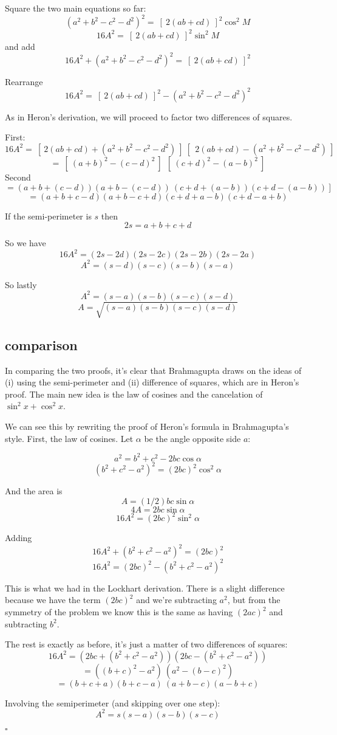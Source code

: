 \documentclass[11pt, oneside]{article}
\begin{document}
Square the two main equations so far:
\[ (a^2 + b^2 - c^2 - d^2)^2 =  \ [ \ 2(ab + cd) \ ]^2 \cos^2 M \]
\[ 16A^2 =  \ [ \ 2(ab + cd) \ ]^2 \sin^2 M \]
and add
\[ 16A^2 + (a^2 + b^2 - c^2 - d^2)^2 =   \ [ \ 2(ab + cd) \ ]^2 \]

Rearrange
\[ 16A^2 =   \ [ \ 2(ab + cd) \ ]^2 - (a^2 + b^2 - c^2 - d^2)^2 \]

As in Heron's derivation, we will proceed to factor two differences of squares.  

First:
\[ 16A^2 =   \ [ \ 2(ab + cd) + (a^2 + b^2 - c^2 - d^2) \ ] \ [ \ \ 2(ab + cd) - (a^2 + b^2 - c^2 - d^2) \ ] \]
\[ = \ [ \ (a + b)^2 - (c - d)^2 \ ] \  \ [ \ (c + d)^2 - (a - b)^2 \ ] \]
Second
\[ = (a + b + (c - d))(a + b - (c - d)) \ (c + d + (a - b))(c + d - (a - b)) \ ] \]
\[ = (a + b + c - d)(a + b - c + d)(c + d + a - b)(c + d - a + b) \]

If the semi-perimeter is $s$ then
\[ 2s = a + b + c + d \]

So we have
\[ 16A^2 = (2s - 2d)(2s - 2c)(2s - 2b)(2s - 2a) \]
\[ A^2 = (s - d)(s - c)(s - b)(s - a) \]

So lastly
\[ A^2 = (s - a)(s - b)(s - c)(s - d) \]
\[ A = \sqrt{(s - a)(s - b)(s - c)(s - d)} \]

\subsection*{comparison}

In comparing the two proofs, it's clear that Brahmagupta draws on the ideas of (i) using the semi-perimeter and (ii) difference of squares, which are in Heron's proof.  The main new idea is the law of cosines and the cancelation of $\sin^2 x + \cos^2 x$.

We can see this by rewriting the proof of Heron's formula in Brahmagupta's style.  First, the law of cosines.  Let $\alpha$ be the angle opposite side $a$:

\[ a^2 = b^2 + c^2 - 2bc \cos \alpha \]
\[ (b^2 + c^2 - a^2)^2 = (2bc)^2 \cos^2 \alpha \]

And the area is
\[ A = (1/2) bc \sin \alpha \]
\[ 4A = 2bc \sin \alpha \]
\[ 16A^2 = (2bc)^2 \sin^2 \alpha \]

Adding
\[ 16A^2 + (b^2 + c^2 - a^2)^2 = (2bc)^2  \]
\[ 16A^2 = (2bc)^2 - (b^2 + c^2 - a^2)^2  \]

This is what we had in the Lockhart derivation.  There is a slight difference because we have the term $(2bc)^2$ and we're subtracting $a^2$, but from the symmetry of the problem we know this is the same as having  $(2ac)^2$ and subtracting $b^2$.

The rest is exactly as before, it's just a matter of two differences of squares:
\[ 16A^2 = (2bc + (b^2 + c^2 - a^2))(2bc - (b^2 + c^2 - a^2)) \]
\[ = ((b + c)^2 - a^2) \ (a^2 - (b - c)^2) \]
\[ = (b + c + a)(b + c - a) \ (a + b - c)(a - b + c) \]

Involving the semiperimeter (and skipping over one step):
\[ A^2 = s(s - a)(s - b)(s - c) \]

$\square$
\end{document}
